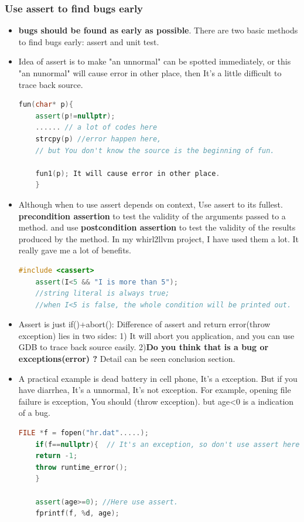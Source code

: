 \documentclass[a4paper,12pt,twoside]{book}
\begin{document}
\subsubsection{Use assert to find bugs early}
\begin{itemize}
	\item \textbf{bugs should be found as early as possible}. There are two basic methods to find bugs early: assert and unit test.
	\item Idea of assert is to make "an unnormal" can be spotted immediately, or this "an nunormal" will cause error in other place, then It's a little difficult to trace back source.
	\begin{lstlisting}[frame=single, language=c++]
	fun(char* p){
	assert(p!=nullptr);
	...... // a lot of codes here
	strcpy(p) //error happen here,
	// but You don't know the source is the beginning of fun.
	
	fun1(p); It will cause error in other place.
	}
	\end{lstlisting}
	
	\item Although when to use assert depends on context, Use assert to its fullest. \textbf{precondition assertion} to test the validity of the arguments passed to a method. and use \textbf{postcondition assertion} to test the validity of the results produced by the method.  In my whirl2llvm project, I have used them a lot. It really gave me a lot of benefits.
	\begin{lstlisting}[frame=single, language=c++]
	#include <cassert>
	assert(I<5 && "I is more than 5");
	//string literal is always true;
	//when I<5 is false, the whole condition will be printed out.
	\end{lstlisting}
	
	
	\item Assert is just if()+abort(): Difference of assert and return error(throw exception)  lies in two sides: 1) It will abort you application, and you can use GDB to trace back source easily. 2)\textbf{Do you think that is a bug or  exceptions(error) ?} Detail can be seen conclusion section.
	
	\item A practical example is dead battery in cell phone, It's a exception. But if you have diarrhea, It's a unnormal, It's not exception. For example, opening file failure is exception, You should (throw exception). but age<0 is a indication of a bug.
	\begin{lstlisting}[frame=single, language=c++]
	FILE *f = fopen("hr.dat".....);
	if(f==nullptr){  // It's an exception, so don't use assert here.
	return -1;
	throw runtime_error();
	}
	
	assert(age>=0); //Here use assert.
	fprintf(f, %d, age);
	\end{lstlisting}
	
\end{itemize}
\end{document}
